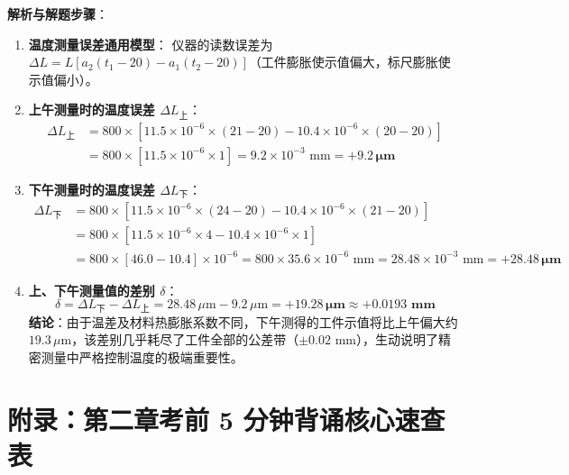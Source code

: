 \documentclass[11pt,a4paper]{ctexart}
\begin{document}
\vspace{4pt}
\noindent\textbf{解析与解题步骤}：
\begin{enumerate}[leftmargin=1.5em, itemsep=3pt]
    \item \textbf{温度测量误差通用模型}：
    仪器的读数误差为 $\Delta L = L [a_2(t_1 - 20) - a_1(t_2 - 20)]$（工件膨胀使示值偏大，标尺膨胀使示值偏小）。
    
    \item \textbf{上午测量时的温度误差 $\Delta L_{\text{上}}$}：
    \begin{align*}
    \Delta L_{\text{上}} &= 800 \times \left[ 11.5 \times 10^{-6} \times (21 - 20) - 10.4 \times 10^{-6} \times (20 - 20) \right] \\
    &= 800 \times [11.5 \times 10^{-6} \times 1] = 9.2 \times 10^{-3}\text{ mm} = \mathbf{+9.2\,\mu\text{m}}
    \end{align*}
    
    \item \textbf{下午测量时的温度误差 $\Delta L_{\text{下}}$}：
    \begin{align*}
    \Delta L_{\text{下}} &= 800 \times \left[ 11.5 \times 10^{-6} \times (24 - 20) - 10.4 \times 10^{-6} \times (21 - 20) \right] \\
    &= 800 \times [11.5 \times 10^{-6} \times 4 - 10.4 \times 10^{-6} \times 1] \\
    &= 800 \times [46.0 - 10.4] \times 10^{-6} = 800 \times 35.6 \times 10^{-6}\text{ mm} = 28.48 \times 10^{-3}\text{ mm} = \mathbf{+28.48\,\mu\text{m}}
    \end{align*}
    
    \item \textbf{上、下午测量值的差别 $\delta$}：
    \[ \delta = \Delta L_{\text{下}} - \Delta L_{\text{上}} = 28.48\,\mu\text{m} - 9.2\,\mu\text{m} = \mathbf{+19.28\,\mu\text{m}} \approx \mathbf{+0.0193\text{ mm}} \]
    \textbf{结论}：由于温差及材料热膨胀系数不同，下午测得的工件示值将比上午偏大约 $19.3\,\mu\text{m}$，该差别几乎耗尽了工件全部的公差带（$\pm 0.02\text{ mm}$），生动说明了精密测量中严格控制温度的极端重要性。
\end{enumerate}

\newpage
\section{附录：第二章考前 5 分钟背诵核心速查表}
\end{document}
